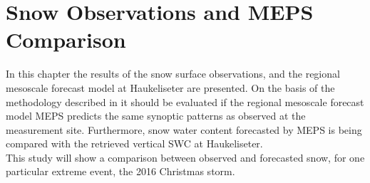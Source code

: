 \chapter{Snow Observations and MEPS Comparison}\label{ch:Res}
In this chapter the results of the snow surface observations, 
and the regional mesoscale forecast model at Haukeliseter are presented. On the basis of the methodology described in  it should be evaluated if the regional mesoscale forecast model MEPS predicts the same synoptic patterns as observed at the measurement site. Furthermore, snow water content forecasted by MEPS is being compared with the retrieved vertical SWC at Haukeliseter. 
\\
This study will show a comparison between observed and forecasted snow, for one particular extreme event, the 2016 Christmas storm.

